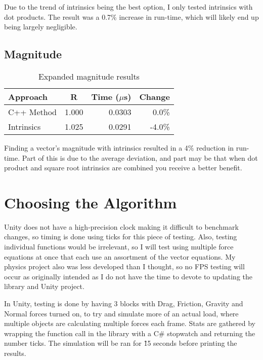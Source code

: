 \documentclass{article}
\begin{document}
Due to the trend of intrinsics being the best option, I only tested intrinsics with dot products. The result was a 0.7\% increase in run-time, which will likely end up being largely negligible.

\vspace{5mm}

\subsection{Magnitude}

\begin{table}[ht!]
\centering
\begin{tabular}{l|c|r|r}
    Approach        &   R   &   Time ($\mu$s)   &   Change \\
\hline
C++ Method          &  1.000  &  0.0303  &   0.0\%  \\
Intrinsics          &  1.025  &  0.0291  &  -4.0\%  \\
\end{tabular}
\caption{Expanded magnitude results}
\end{table}

Finding a vector’s magnitude with intrinsics resulted in a 4\% reduction in run-time. Part of this is due to the average deviation, and part may be that when dot product and square root intrinsics are combined you receive a better benefit.

\section{Choosing the Algorithm}

Unity does not have a high-precision clock making it difficult to benchmark changes, so timing is done using ticks for this piece of testing. Also, testing individual functions would be irrelevant, so I will test using multiple force equations at once that each use an assortment of the vector equations. My physics project also was less developed than I thought, so no FPS testing will occur as originally intended as I do not have the time to devote to updating the library and Unity project.

\vspace{3mm}

In Unity, testing is done by having 3 blocks with Drag, Friction, Gravity and Normal forces turned on, to try and simulate more of an actual load, where multiple objects are calculating multiple forces each frame. Stats are gathered by wrapping the function call in the library with a C\# stopwatch and returning the number ticks. The simulation will be ran for \~15 seconds before printing the results.
\end{document}
